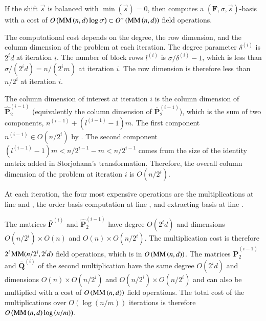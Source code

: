 \begin{thm}
\label{thm:balancedCost}If the shift $\vec{s}$ is balanced with
$\min\left(\vec{s}\right)=0$, then  computes
a $\left(\mathbf{F},\sigma,\vec{s}\right)$-basis with a cost of $O\left(\MM\left(n,d\right)\log\sigma\right)\subset O^{\sim}\left(\MM\left(n,d\right)\right)$
field operations.\end{thm}
\begin{pf}
The computational cost depends on the degree, the row dimension, and
the column dimension of the problem at each iteration. The degree
parameter $\delta^{\left(i\right)}$ is $2^{i}d$ at iteration $i$.
The number of block rows $l^{\left(i\right)}$ is $\sigma/\delta^{\left(i\right)}-1$,
which is less than $\sigma/(2^{i}d)=n/(2^{i}m)$ at iteration $i$.
The row dimension is therefore less than $n/2^{i}$ at iteration $i$.

The column dimension of interest at iteration $i$ is the column dimension
of $\hat{\mathbf{P}}_{2}^{\left(i-1\right)}$ (equivalently the column
dimension of $\bar{\mathbf{P}}_{2}^{\left(i-1\right)}$), which is
the sum of two components, $n^{\left(i-1\right)}+(l^{\left(i-1\right)}-1)m$.
The first component $n^{\left(i-1\right)}\in O(n/2^{i})$ by .
The second component $(l^{\left(i-1\right)}-1)m<n/2^{i-1}-m<n/2^{i-1}$
comes from the size of the identity matrix added in Storjohann's transformation.
Therefore, the overall column dimension of the problem at iteration
$i$ is $O(n/2^{i})$.

At each iteration, the four most expensive operations are the multiplications
at line  and ,
the order basis computation at line ,
and extracting basis at line .

The matrices $\bar{\mathbf{F}}^{\left(i\right)}$ and $\hat{\mathbf{P}}_{2}^{\left(i-1\right)}$
have degree $O(2^{i}d)$ and dimensions $O(n/2^{i})\times O\left(n\right)$
and $O\left(n\right)\times O(n/2^{i})$. The multiplication cost is
therefore $2^{i}\MM(n/2^{i},2^{i}d)$ field operations, which is in
$O\left(\MM\left(n,d\right)\right)$. The matrices $\hat{\mathbf{P}}_{2}^{\left(i-1\right)}$
and $\bar{\mathbf{Q}}^{\left(i\right)}$ of the second multiplication
have the same degree $O(2^{i}d)$ and dimensions $O\left(n\right)\times O(n/2^{i})$
and $O(n/2^{i})\times O(n/2^{i})$ and can also be multiplied with
a cost of $O\left(\MM\left(n,d\right)\right)$ field operations. The
total cost of the multiplications over $O(\log\left(n/m\right))$
iterations is therefore $O\left(\MM\left(n,d\right)\log\left(n/m\right)\right)$.


\end{pf}
